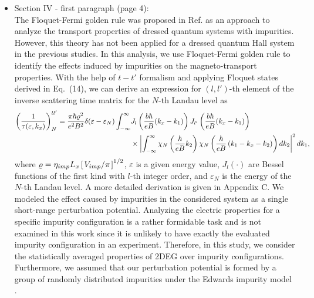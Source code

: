 \documentclass{article}
\begin{document}
\begin{itemize}
  \item Section IV - first paragraph (page 4):\\
  {\color{Maroon}
  The Floquet-Fermi golden rule was proposed in Ref. \cite{wackerl20} as an approach to analyze the transport properties of dressed quantum systems with impurities.
  However, this theory has not been applied for a dressed quantum Hall system in the previous studies. In this analysis, we use Floquet-Fermi golden rule to identify the effects induced by impurities on the magneto-transport properties.
  With the help of $t-t'$ formalism \cite{wackerl20,grifoni98,sambe75,peskin93,althorpe97} and applying Floquet states derived in Eq.~(14), we can derive an  expression for $(l,l')$-th element of the inverse scattering time matrix for the $N$-th Landau level as
  \begin{equation} \label{eq:15}
    \begin{aligned}
      \left(\frac{1}{\tau(\varepsilon,k_x)}\right)^{ll'}_N =
      \frac{ \pi \hbar\varrho^2}{e^2B^2} \delta(\varepsilon - \varepsilon_N)
      \int_{-\infty}^{\infty} &
      J_l \bm{\left(} \frac{b\hbar}{eB}({k}_x - k_1) \bm{\right)}
      J_{l'} \bm{\left(} \frac{b\hbar}{eB}({k}_x - k_1) \bm{\right)}
      \\
      & \times
      \left|
      \int_{-\infty}^{\infty}
      \chi_N \left( \frac{\hbar}{eB}k_2 \right)
      \chi_N \bm{\left(} \frac{\hbar}{eB}
      \left( k_1 - {k}_x - k_2 \right) \bm{\right)}
      dk_2 \right|^2 d k_1,
    \end{aligned}
  \end{equation}
  where $\varrho = \eta_{imp} L_x \left[\flatfrac{ V_{imp}}{\pi}\right]^{1/2}$, $\varepsilon$ is a given energy value, $J_l(\cdot)$ are Bessel functions of the first kind with $l$-th integer order, and $\varepsilon_N$ is the energy of the $N$-th Landau level.
  A more detailed derivation is given in Appendix C.
  We modeled the effect caused by impurities in the considered system as a single short-range perturbation potential. Analyzing the electric properties for a specific impurity configuration is a rather formidable task and is not examined in this work since it is unlikely to have exactly the evaluated impurity configuration in an experiment.
  Therefore, in this study, we consider the statistically averaged properties of 2DEG over impurity configurations.
  Furthermore, we assumed that our perturbation potential is formed by a group of randomly distributed impurities under the Edwards impurity model \cite{akkermans10,wackerl20}.
}
\end{itemize}
\end{document}
